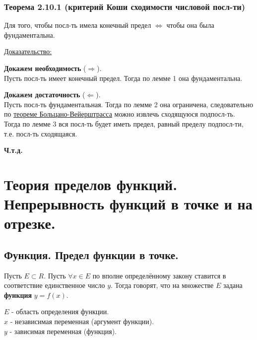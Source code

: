 \documentclass[12pt]{article}
\begin{document}
    \subsubsection*{Теорема 2.10.1 (критерий Коши сходимости числовой посл-ти)}\label{th:2.10.1}
    Для того, чтобы посл-ть имела конечный предел $\Leftrightarrow$ чтобы она была фундаментальна.\par\noindent
    \underline{Доказательство:}\par
    \begin{adjustwidth}{1.5em}{1.5em}
        \textbf{Докажем необходимость} ($\Rightarrow$).\\
        Пусть посл-ть имеет конечный предел. Тогда по лемме 1 она фундаментальна.\par\noindent
        \textbf{Докажем достаточность} ($\Leftarrow$).\\
        Пусть посл-ть фундаментальная. Тогда по лемме 2 она ограничена, следовательно по \hyperref[th:2.8.1]{теореме Больцано-Вейерштрасса} можно извлечь сходящуюся подпосл-ть.\\
        Тогда по лемме 3 вся посл-ть будет иметь предел, равный пределу подпосл-ти, т.е. посл-ть сходящаяся.
        \begin{center}
            \textbf{Ч.т.д.}
        \end{center}
    \end{adjustwidth}

    \section{Теория пределов функций. Непрерывность функций в точке и на отрезке.}
    \subsection{Функция. Предел функции в точке.}
    \noindent Пусть $E \subset R$. Пусть $\forall x \in E$ по вполне определённому закону ставится в соответствие единственное число $y$. Тогда говорят, что на множестве $E$ задана \textbf{функция} $y = f(x)$.\par\noindent
    $E$ - область определения функции.\\
    $x$ - независимая переменная (аргумент функции).\\
    $y$ - зависимая переменная (функция).
\end{document}
